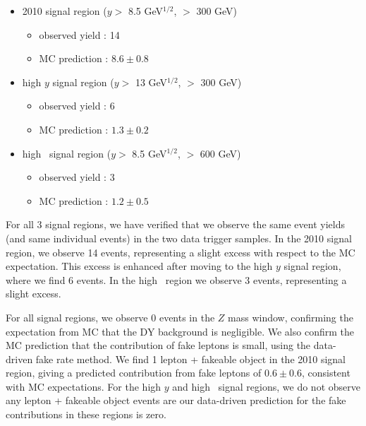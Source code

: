 \begin{itemize}
\item 2010 signal region ($y >$ 8.5 GeV$^{1/2}$, \Ht $>$ 300 GeV)
   \begin{itemize} 
   \item observed yield : 14 
   \item MC prediction  : $8.6 \pm 0.8$
   \end{itemize}  
\item high $y$ signal region ($y >$ 13 GeV$^{1/2}$, \Ht $>$ 300 GeV)
   \begin{itemize} 
   \item observed yield : 6 
   \item MC prediction  : $1.3 \pm 0.2$
   \end{itemize}  
\item high \Ht\ signal region ($y >$ 8.5 GeV$^{1/2}$, \Ht $>$ 600 GeV)
   \begin{itemize} 
   \item observed yield : 3 
   \item MC prediction  : $1.2 \pm 0.5$
   \end{itemize}  
\end{itemize}

For all 3 signal regions, we have verified that we observe the same
event yields (and same individual events) in the two data trigger samples.
In the 2010 signal region, we observe 14 events, representing 
a slight excess with respect to the MC expectation. This excess is enhanced
after moving to the high $y$ signal region, where we find 6 events. 
In the high \Ht\ region we observe 3 events, representing a slight excess.

For all signal regions, we observe 0 events in the $Z$ mass window,
confirming the expectation from MC that the 
DY background is negligible. We also confirm the MC prediction that
the contribution of fake leptons is small, using the data-driven fake
rate method. We find 1 lepton + fakeable object in the 2010 signal region,
giving a predicted contribution from fake leptons of $0.6 \pm 0.6$, consistent
with MC expectations. For the high $y$ and high \Ht\ signal regions, we do
not observe any lepton + fakeable object events are our data-driven prediction
for the fake contributions in these regions is zero.


